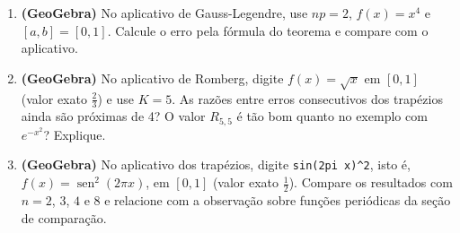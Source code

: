 \begin{enumerate}[label=\textbf{\arabic*.},leftmargin=*]
\item \textbf{(GeoGebra)} No aplicativo de Gauss-Legendre, use $np=2$, $f(x)=x^4$ e
  $[a,b]=[0,1]$. Calcule o erro pela fórmula do teorema e compare com o aplicativo.

\item\label{ex:raiz} \textbf{(GeoGebra)} No aplicativo de Romberg, digite $f(x)=\sqrt{x}$ em
  $[0,1]$ (valor exato $\frac23$) e use $K=5$. As razões entre erros consecutivos dos
  trapézios ainda são próximas de 4? O valor $R_{5,5}$ é tão bom quanto no exemplo com
  $e^{-x^2}$? Explique.

\item \textbf{(GeoGebra)} No aplicativo dos trapézios, digite \texttt{sin(2pi x)\^{}2}, isto é,
  $f(x)=\operatorname{sen}^2(2\pi x)$, em $[0,1]$ (valor exato $\frac12$). Compare os resultados
  com $n=2$, $3$, $4$ e $8$ e relacione com a observação sobre funções periódicas da seção de
  comparação.
\end{enumerate}

